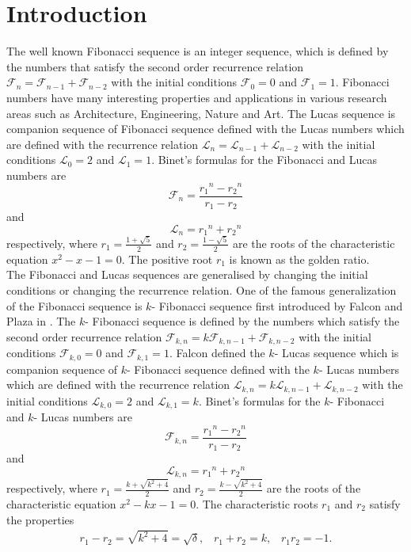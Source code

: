 \section{Introduction}
The well known Fibonacci sequence is an integer sequence, which is defined by the numbers that satisfy the second order recurrence relation $\mathcal{F}_n = \mathcal{F}_{n-1}+\mathcal{F}_{n-2}$ with the initial conditions $\mathcal{F}_0 = 0$ and $\mathcal{F}_1 = 1$. Fibonacci numbers have many interesting properties and applications in various research areas such as Architecture, Engineering, Nature and Art. The Lucas sequence is companion sequence of Fibonacci sequence defined with the Lucas numbers which are defined with the recurrence relation $\mathcal{L}_n = \mathcal{L}_{n-1}+\mathcal{L}_{n-2}$ with the initial conditions $\mathcal{L}_0 = 2$ and $\mathcal{L}_1 = 1$. Binet's formulas for the Fibonacci and Lucas numbers are 
$$\mathcal{F}_n=\frac{{r_1}^n-{r_2}^n}{r_1-r_2}$$ and $$\mathcal{L}_n={r_1}^n+{r_2}^n$$ respectively, where $r_1 = \frac{1+\sqrt{5}}{2}$ and $r_2=\frac{1-\sqrt{5}}{2}$ are the roots of the characteristic equation $x^2 - x -1 = 0$. The positive root $r_1$ is known as the golden ratio. \\
The Fibonacci and Lucas  sequences are generalised by changing the initial conditions or changing the recurrence relation. One of the famous generalization of the Fibonacci sequence is $k$- Fibonacci sequence first introduced by Falcon and Plaza in \cite{5}. The $k$- Fibonacci sequence is defined by the numbers which satisfy the second order recurrence relation $\mathcal{F}_{k,n} = k\mathcal{F}_{k,n-1}+\mathcal{F}_{k,n-2}$ with the initial conditions $\mathcal{F}_{k,0} = 0$ and $\mathcal{F}_{k,1} = 1$. Falcon \cite{4} defined the $k$- Lucas sequence which is companion sequence of $k$- Fibonacci sequence defined with the $k$- Lucas numbers which are defined with the recurrence relation $\mathcal{L}_{k,n} = k\mathcal{L}_{k,n-1}+\mathcal{L}_{k,n-2}$ with the initial conditions $\mathcal{L}_{k,0} = 2$ and $\mathcal{L}_{k,1} = k$. Binet's formulas for the $k$- Fibonacci and $k$- Lucas numbers are $$\mathcal{F}_{k, n}=\frac{{r_1}^n-{r_2}^n}{r_1-r_2}$$ and $$\mathcal{L}_{k,n}={r_1}^n+{r_2}^n$$ respectively, where $r_1 = \frac{k+\sqrt{k^2+4}}{2}$ and $r_2=\frac{k-\sqrt{k^2+4}}{2}$ are the roots of the characteristic equation $x^2 - kx -1 = 0$.  The characteristic roots $r_1$ and $r_2$ satisfy the properties  
 \begin{align*} 
   r_{1}-r_{2} = \sqrt{k^2+4}= \sqrt{\delta}\text{,}
 \quad r_{1}+r_{2}=k\text{,}\quad r_{1}r_{2}=-1.
\end{align*} 
